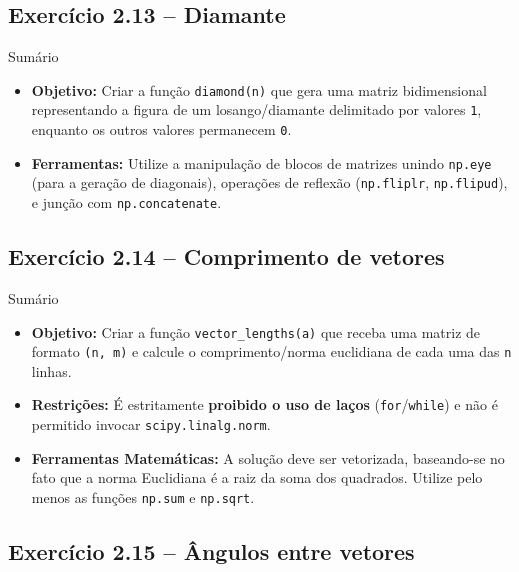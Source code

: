 \documentclass[11pt,a4paper]{article}
\begin{document}
\subsection*{Exercício 2.13 -- Diamante}

\begin{exercicio}{Sumário}
\begin{itemize}
    \item \textbf{Objetivo:} Criar a função \texttt{diamond(n)} que gera uma matriz bidimensional representando a figura de um losango/diamante delimitado por valores \texttt{1}, enquanto os outros valores permanecem \texttt{0}.
    \item \textbf{Ferramentas:} Utilize a manipulação de blocos de matrizes unindo \texttt{np.eye} (para a geração de diagonais), operações de reflexão (\texttt{np.fliplr}, \texttt{np.flipud}), e junção com \texttt{np.concatenate}.
\end{itemize}
\end{exercicio}

\subsection*{Exercício 2.14 -- Comprimento de vetores}

\begin{exercicio}{Sumário}
\begin{itemize}
    \item \textbf{Objetivo:} Criar a função \texttt{vector\_lengths(a)} que receba uma matriz de formato \texttt{(n, m)} e calcule o comprimento/norma euclidiana de cada uma das \texttt{n} linhas.
    \item \textbf{Restrições:} É estritamente \textbf{proibido o uso de laços} (\texttt{for}/\texttt{while}) e não é permitido invocar \texttt{scipy.linalg.norm}.
    \item \textbf{Ferramentas Matemáticas:} A solução deve ser vetorizada, baseando-se no fato que a norma Euclidiana é a raiz da soma dos quadrados. Utilize pelo menos as funções \texttt{np.sum} e \texttt{np.sqrt}.
\end{itemize}
\end{exercicio}

\subsection*{Exercício 2.15 -- Ângulos entre vetores}
\end{document}
